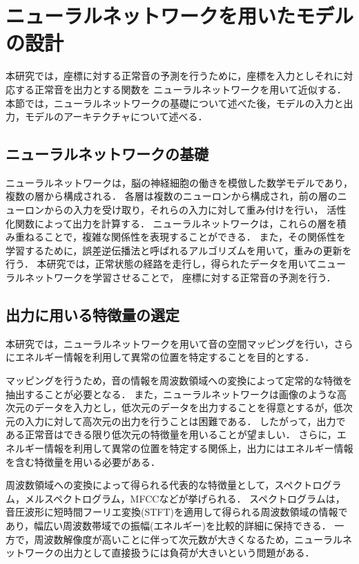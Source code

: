 \documentclass[../main]{subfiles}
\begin{document}
\section{ニューラルネットワークを用いたモデルの設計}
\label{sec:pmethod_neural_network}

本研究では，座標に対する正常音の予測を行うために，座標を入力としそれに対応する正常音を出力とする関数を
ニューラルネットワークを用いて近似する．
本節では，ニューラルネットワークの基礎について述べた後，モデルの入力と出力，モデルのアーキテクチャについて述べる．
\subsection{ニューラルネットワークの基礎}
ニューラルネットワークは，脳の神経細胞の働きを模倣した数学モデルであり，複数の層から構成される．
各層は複数のニューロンから構成され，前の層のニューロンからの入力を受け取り，それらの入力に対して重み付けを行い，
活性化関数によって出力を計算する．
ニューラルネットワークは，これらの層を積み重ねることで，複雑な関係性を表現することができる．
また，その関係性を学習するために，誤差逆伝播法と呼ばれるアルゴリズムを用いて，重みの更新を行う．
本研究では，正常状態の経路を走行し，得られたデータを用いてニューラルネットワークを学習させることで，
座標に対する正常音の予測を行う．

\subsection{出力に用いる特徴量の選定}

本研究では，ニューラルネットワークを用いて音の空間マッピングを行い，さらにエネルギー情報を利用して異常の位置を特定することを目的とする．

マッピングを行うため，音の情報を周波数領域への変換によって定常的な特徴を抽出することが必要となる． また，ニューラルネットワークは画像のような高次元のデータを入力とし，低次元のデータを出力することを得意とするが，低次元の入力に対して高次元の出力を行うことは困難である． したがって，出力である正常音はできる限り低次元の特徴量を用いることが望ましい． さらに，エネルギー情報を利用して異常の位置を特定する関係上，出力にはエネルギー情報を含む特徴量を用いる必要がある．

周波数領域への変換によって得られる代表的な特徴量として，スペクトログラム，メルスペクトログラム，MFCCなどが挙げられる． スペクトログラムは，音圧波形に短時間フーリエ変換(STFT)を適用して得られる周波数領域の情報であり，幅広い周波数帯域での振幅(エネルギー)を比較的詳細に保持できる． 一方で，周波数解像度が高いことに伴って次元数が大きくなるため，ニューラルネットワークの出力として直接扱うには負荷が大きいという問題がある．
\end{document}
